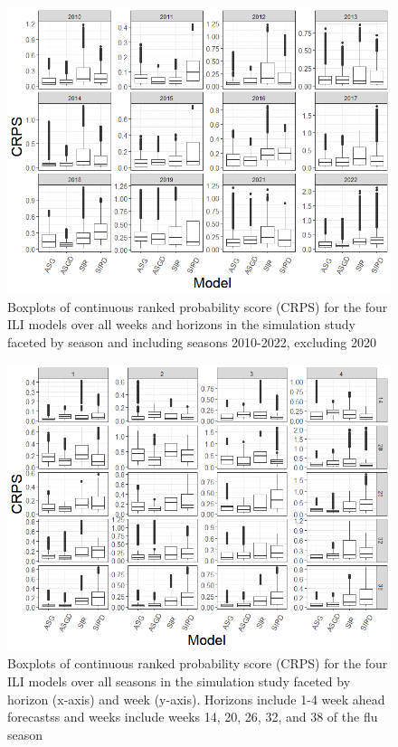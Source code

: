 \documentclass[ba]{imsart}
\theoremstyle{plain}
\theoremstyle{definition}
\theoremstyle{remark}
\begin{document}
\begin{figure}
    \centering
    \includegraphics[scale=.5]{../Images/crps_by_season.png}
    \caption{Boxplots of continuous ranked probability score (CRPS) for the four ILI models over all weeks and horizons in the simulation study faceted by season and including seasons 2010-2022, excluding 2020}
    \label{fig:crps_by_season}
\end{figure}

\begin{figure}
    \centering
    \includegraphics[scale=.5]{../Images/crps_by_week_horizon.png}
    \caption{Boxplots of continuous ranked probability score (CRPS) for the four ILI models over all seasons in the simulation study faceted by horizon (x-axis) and week (y-axis). Horizons include 1-4 week ahead forecastss and weeks include weeks 14, 20, 26, 32, and 38 of the flu season}
    \label{fig:crps_by_week_horizon}
\end{figure}
\end{document}
